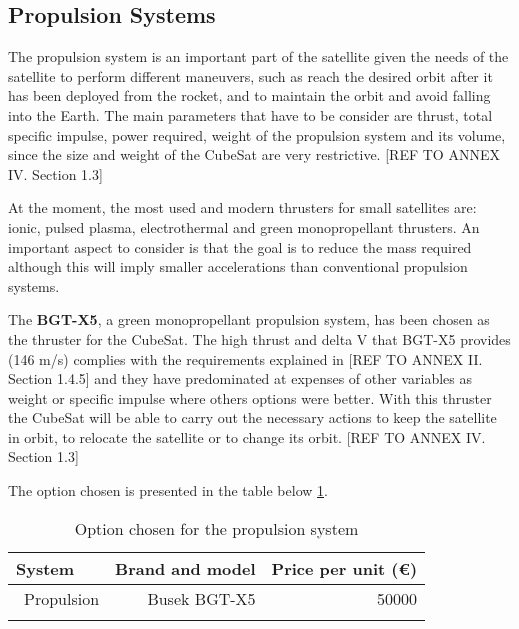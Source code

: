 \subsection{Propulsion Systems}
\label{ch:PropulsionSystems}
The propulsion system is an important part of the satellite given the needs of the satellite to perform different maneuvers, such as reach the desired orbit after it has been deployed from the rocket, and to maintain the orbit and avoid falling into the Earth. The main parameters that have to be consider are thrust, total specific impulse, power required, weight of the propulsion system and its volume, since the size and weight of the CubeSat are very restrictive. [{REF TO ANNEX IV. Section 1.3}]

At the moment, the most used and modern thrusters for small satellites are: ionic, pulsed plasma, electrothermal and green monopropellant thrusters. An important aspect to consider is that the goal is to reduce the mass required although this will imply smaller accelerations than conventional propulsion systems.

The \textbf{BGT-X5}, a green monopropellant propulsion system, has been chosen as the thruster for the CubeSat. The high thrust and delta V that BGT-X5 provides (146 m/s) complies with the requirements explained in [{REF TO ANNEX II. Section 1.4.5}] and they have predominated at expenses of other variables as weight or specific impulse where others options were better. With this thruster the CubeSat will be able to carry out the necessary actions to keep the satellite in orbit, to relocate the satellite or to change its orbit. [{REF TO ANNEX IV. Section 1.3}]

The option chosen is presented in the table below \ref{propulsionfinal}.

\begin{longtable}{| l | r | r | }
\hline
\rowcolor[gray]{0.80}	\textbf{System} &  \textbf{Brand and model}     & \textbf{Price per unit (\euro)}   \\
\hline
\endfirsthead

	   ~Propulsion & Busek BGT-X5 & 50000 \\
	\hline

\caption{Option chosen for the propulsion system}
\label{propulsionfinal}
\end{longtable}